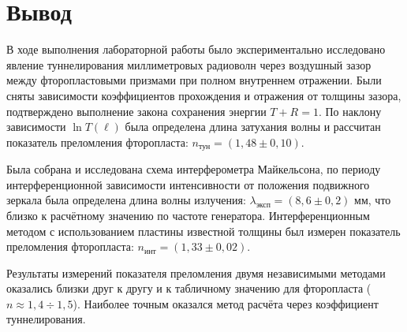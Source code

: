 \documentclass[12pt,a4paper]{article}
\begin{document}
\section*{Вывод}

В ходе выполнения лабораторной работы было экспериментально исследовано явление туннелирования миллиметровых радиоволн через воздушный зазор между фторопластовыми призмами при полном внутреннем отражении. Были сняты зависимости коэффициентов прохождения и отражения от толщины зазора, подтверждено выполнение закона сохранения энергии $T + R = 1$.%
По наклону зависимости $\ln T(\ell)$ была определена длина затухания волны и рассчитан показатель преломления фторопласта: $n_{\text{тун}} = (1,48\pm0,10)$.

Была собрана и исследована схема интерферометра Майкельсона,%
по периоду интерференционной зависимости интенсивности от положения подвижного зеркала была определена длина волны излучения: $\lambda_{\text{эксп}} = (8,6\pm0,2)$ мм, что близко к расчётному значению по частоте генератора. Интерференционным методом с использованием пластины известной толщины был измерен показатель преломления фторопласта: $n_{\text{инт}} = (1,33\pm0,02)$.

Результаты измерений показателя преломления двумя независимыми методами оказались близки друг к другу и к табличному значению для фторопласта ($n \approx 1{,}4\div1{,}5$). Наиболее точным оказался метод расчёта через коэффициент туннелирования.%
\end{document}
